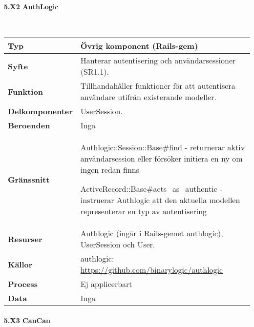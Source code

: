 \documentclass[a4paper, twoside, 11pt, titlepage]{article}
\begin{document}
			\clearpage %
			\paragraph{5.X2 AuthLogic}\

			\begin {table} [ht] \begin{tabular} {  p{3.5cm} p{11.6cm} }
				\hline
				{\sffamily\textbf{Typ}} & {Övrig komponent (Rails-gem)} \\
				\hline
				{\sffamily\textbf{Syfte}} & {Hanterar autentisering och användarsessioner (SR1.1).} \\
				\hline
				{\sffamily\textbf{Funktion}} & {Tillhandahåller funktioner för att autentisera användare utifrån existerande modeller.} \\
				\hline
				{\sffamily\textbf{Delkomponenter}} & {UserSession.} \\
				\hline
				{\sffamily\textbf{Beroenden}} & {Inga} \\
				\hline
				{\sffamily\textbf{Gränssnitt}} & {Authlogic::Session::Base\#find - returnerar aktiv användarsession eller försöker initiera en ny om ingen redan finns

ActiveRecord::Base\#acts\_as\_authentic - instruerar Authlogic att den aktuella modellen representerar en typ av autentisering} \\
				\hline
				{\sffamily\textbf{Resurser}} & {Authlogic (ingår i Rails-gemet authlogic), UserSession och User.} \\
				\hline
				{\sffamily\textbf{Källor}} & {authlogic: \url{https://github.com/binarylogic/authlogic}} \\
				\hline
				{\sffamily\textbf{Process}} & {Ej applicerbart} \\
				\hline
				{\sffamily\textbf{Data}} & {Inga} \\
				\hline
			\end{tabular} \end{table} \FloatBarrier


			\clearpage %
			\paragraph{5.X3 CanCan}\
\end{document}
